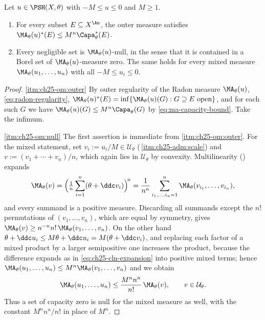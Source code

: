 \begin{corollary}
\label{cor:ch25-outer-ma-bound}
Let \(u\in\PSH(X,\theta)\) with \(-M\leq u\leq0\) and \(M\geq1\).
\begin{enumerate}
\item\label{itm:ch25-om:outer}
 For every subset \(E\subseteq X^{\An}\), the outer measure satisfies
 \(\MA_\theta(u)^*(E)\leq M^n\Capa_\theta^*(E)\).
\item\label{itm:ch25-om:null}
 Every negligible set is \(\MA_\theta(u)\)-null, in the sense that it is
 contained in a Borel set of \(\MA_\theta(u)\)-measure zero.  The same holds
 for every mixed measure \(\MA_\theta(u_1,\ldots,u_n)\) with all
 \(-M\leq u_i\leq0\).
\end{enumerate}
\end{corollary}

\begin{proof}
\cref{itm:ch25-om:outer}  By outer regularity of the Radon measure
\(\MA_\theta(u)\), \eqref{eq:radon-regularity},
\(\MA_\theta(u)^*(E)=\inf\{\MA_\theta(u)(G):G\supseteq E\ \text{open}\}\),
and for each such \(G\) we have
\(\MA_\theta(u)(G)\leq M^n\Capa_\theta(G)\) by
\eqref{eq:ma-capacity-bound}.  Take the infimum.

\cref{itm:ch25-om:null}  The first assertion is immediate from
\cref{itm:ch25-om:outer}.  For the mixed statement, set
\(v_i:=u_i/M\in\mathcal U_\theta\)
(\,\cref{itm:ch25-adm:scale}) and
\(v:=(v_1+\cdots+v_n)/n\), which again lies in \(\mathcal U_\theta\) by
convexity.  Multilinearity () expands
\[
 \MA_\theta(v)=\Bigl(\tfrac1n\sum_{i=1}^n(\theta+\ddc v_i)\Bigr)^{\!n}
 =\frac1{n^n}\sum_{i_1,\ldots,i_n=1}^n
    \MA_\theta(v_{i_1},\ldots,v_{i_n}),
\]
and every summand is a positive measure.  Discarding all summands except the
\(n!\) permutations of \((v_1,\ldots,v_n)\), which are equal by symmetry,
gives \(\MA_\theta(v)\geq n^{-n}n!\,\MA_\theta(v_1,\ldots,v_n)\).  On the
other hand \(\theta+\ddc u_i\leq M\theta+\ddc u_i=M(\theta+\ddc v_i)\), and
replacing each factor of a mixed product by a larger semipositive one
increases the product, because the difference expands as in
\eqref{eq:ch25-cln-expansion} into positive mixed terms; hence
\(\MA_\theta(u_1,\ldots,u_n)\leq M^n\MA_\theta(v_1,\ldots,v_n)\) and we
obtain
\[
 \MA_\theta(u_1,\ldots,u_n)
 \leq\frac{M^nn^n}{n!}\,\MA_\theta(v),
 \qquad v\in\mathcal U_\theta .
\]
Thus a set of capacity zero is null for the mixed measure as well, with the
constant \(M^nn^n/n!\) in place of \(M^n\).
\end{proof}

